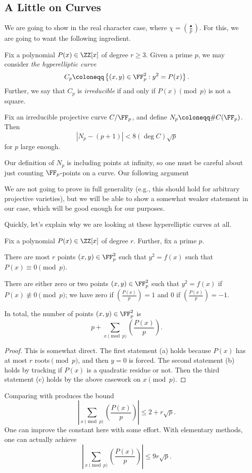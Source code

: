 \documentclass[../notes.tex]{subfiles}
\begin{document}
\subsection{A Little on Curves}
We are going to show  in the real character case, where $\chi=\left(\frac\bullet p\right)$. For this, we are going to want the following ingredient.
\begin{definition}
	Fix a polynomial $P(x)\in\ZZ[x]$ of degree $r\ge3$. Given a prime $p$, we may consider \textit{the hyperelliptic curve}
	\[C_p\coloneqq\left\{(x,y)\in\FF_p^2:y^2=P(x)\right\}.\]
	Further, we say that $C_p$ is \textit{irreducible} if and only if $P(x)\pmod p$ is not a square.
\end{definition}
\begin{theorem} \label{thm:rh-curves}
	Fix an irreducible projective curve $C/\FF_p$, and define $N_p\coloneqq\#C(\FF_p)$. Then
	\[|N_p-(p+1)|<8(\deg C)\sqrt p\]
	for $p$ large enough.
\end{theorem}
\begin{remark}
	Our definition of $N_p$ is including points at infinity, so one must be careful about just counting $\FF_p$-points on a curve. Our following argument
\end{remark}
We are not going to prove  in full generality (e.g., this should hold for arbitrary projective varieties), but we will be able to show a somewhat weaker statement in our case, which will be good enough for our purposes.

Quickly, let's explain why we are looking at these hyperelliptic curves at all.
\begin{lemma} \label{lem:char-sum-from-point}
	Fix a polynomial $P(x)\in\ZZ[x]$ of degree $r$. Further, fix a prime $p$.
	\begin{listalph}
		\item There are most $r$ points $(x,y)\in\FF_p^2$ such that $y^2=f(x)$ such that $P(x)\equiv0\pmod p$.
		\item There are either zero or two points $(x,y)\in\FF_p^2$ such that $y^2=f(x)$ if $P(x)\not\equiv0\pmod p$; we have zero if $\left(\frac{P(x)}p\right)=1$ and $0$ if $\left(\frac{P(x)}p\right)=-1$.
		\item In total, the number of points $(x,y)\in\FF_p^2$ is
		\[p+\sum_{x\pmod p}\left(\frac{P(x)}p\right).\]
	\end{listalph}
\end{lemma}
\begin{proof}
	This is somewhat direct. The first statement (a) holds because $P(x)$ has at most $r$ roots$\pmod p$, and then $y=0$ is forced. The second statement (b) holds by tracking if $P(x)$ is a quadratic residue or not. Then the third statement (c) holds by the above casework on $x\pmod p$.
\end{proof}
Comparing  with  produces the bound
\[\left|\sum_{x\pmod p}\left(\frac{P(x)}p\right)\right|\le 2+r\sqrt p.\]
One can improve the constant here with some effort. With elementary methods, one can actually achieve
\[\left|\sum_{x\pmod p}\left(\frac{P(x)}p\right)\right|\le 9r\sqrt p.\]
\end{document}
